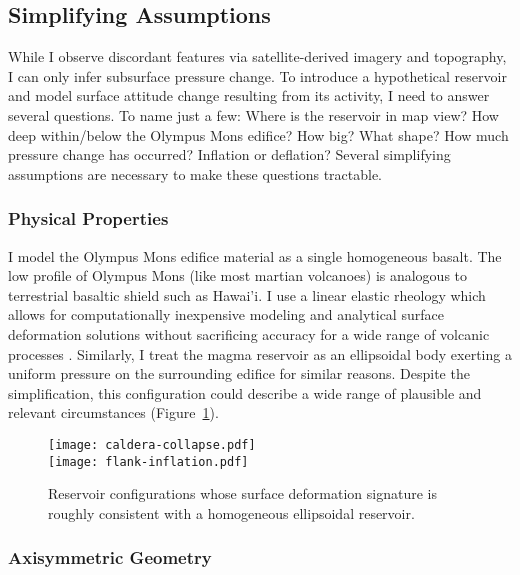 \subsection{Simplifying Assumptions}

While I observe discordant features via satellite-derived imagery and topography, I can only infer subsurface pressure change. To introduce a hypothetical reservoir and model surface attitude change resulting from its activity, I need to answer several questions. To name just a few: Where is the reservoir in map view? How deep within/below the Olympus Mons edifice? How big? What shape? How much pressure change has occurred? Inflation or deflation? Several simplifying assumptions are necessary to make these questions tractable.

\subsubsection{Physical Properties}

I model the Olympus Mons edifice material as a single homogeneous basalt. The low profile of Olympus Mons (like most martian volcanoes) is analogous to terrestrial basaltic shield such as Hawai'i. %
I use a linear elastic rheology which allows for computationally inexpensive modeling and analytical surface deformation solutions \parencite{mogi_relations_1958} without sacrificing accuracy for a wide range of volcanic processes \parencite{grosfils_elastic_2015}. Similarly, I treat the magma reservoir as an ellipsoidal body exerting a uniform pressure on the surrounding edifice for similar reasons. Despite the simplification, this configuration could describe a wide range of plausible and relevant circumstances (Figure~\ref{fig:reservoir-configs}). %

\begin{figure}
    \texttt{[image: caldera-collapse.pdf]}\\
    \vspace{2cm}
    \texttt{[image: flank-inflation.pdf]}
    \caption{Reservoir configurations whose surface deformation signature is roughly consistent with a homogeneous ellipsoidal reservoir.}
    \label{fig:reservoir-configs}
\end{figure}

\subsubsection{Axisymmetric Geometry}


